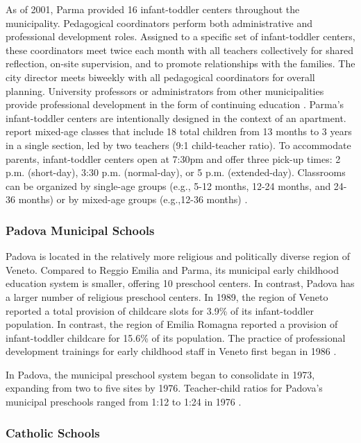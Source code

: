 As of 2001, Parma provided 16 infant-toddler centers throughout the municipality. Pedagogical coordinators perform both administrative and professional development roles. Assigned to a specific set of infant-toddler centers, these coordinators meet twice each month with all teachers collectively for shared reflection, on-site supervision, and to promote relationships with the families. The city director meets biweekly with all pedagogical coordinators for overall planning. University professors or administrators from other municipalities provide professional development in the form of continuing education \citep{Terzi-Cantarelli_2001_Parma}. Parma's infant-toddler centers are intentionally designed in the context of an apartment. \citet{Terzi-Cantarelli_2001_Parma} report mixed-age classes that include 18 total children from 13 months to 3 years in a single section, led by two teachers (9:1 child-teacher ratio). To accommodate parents, infant-toddler centers open at 7:30pm and offer three pick-up times: 2 p.m. (short-day), 3:30 p.m. (normal-day), or 5 p.m. (extended-day). Classrooms can be organized by single-age groups (e.g., 5-12 months, 12-24 months, and 24-36 months) or by mixed-age groups (e.g.,12-36 months) \citep{Majorano-etal_2009_CC-in-P}.

\subsubsection{Padova Municipal Schools}

Padova is located in the relatively more religious and politically diverse region of Veneto. Compared to Reggio Emilia and Parma, its municipal early childhood education system is smaller, offering 10 preschool centers. In contrast, Padova has a larger number of religious preschool centers. In 1989, the region of Veneto reported a total provision of childcare slots for 3.9\% of its infant-toddler population. In contrast, the region of Emilia Romagna reported a provision of infant-toddler childcare for 15.6\% of its population. The practice of professional development trainings for early childhood staff in Veneto first began in 1986 \citep{Becchi-Ferrari_1990_Pub-Inf-Centres-Italy}.

In Padova, the municipal preschool system began to consolidate in 1973, expanding from two to five sites by 1976. Teacher-child ratios for Padova's municipal preschools ranged from 1:12 to 1:24 in 1976 \citep{Padova-Admin-Data_1964-2011,CEHD_2016_Historical-Analysis}.

\subsubsection{Catholic Schools}

